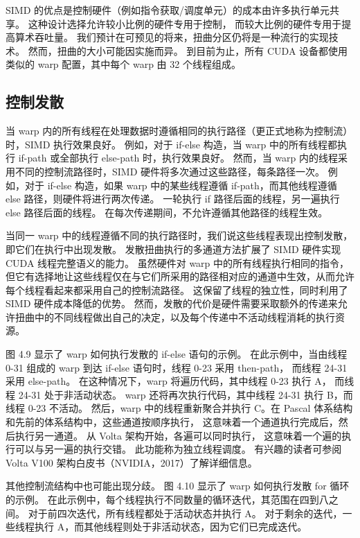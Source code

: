 SIMD 的优点是控制硬件（例如指令获取/调度单元）的成本由许多执行单元共享。 这种设计选择允许较小比例的硬件专用于控制，
而较大比例的硬件专用于提高算术吞吐量。 我们预计在可预见的将来，扭曲分区仍将是一种流行的实现技术。 
然而，扭曲的大小可能因实施而异。 到目前为止，所有 CUDA 设备都使用类似的 warp 配置，其中每个 warp 由 32 个线程组成。

\subsection{控制发散}
当 warp 内的所有线程在处理数据时遵循相同的执行路径（更正式地称为控制流）时，SIMD 执行效果良好。 
例如，对于 if-else 构造，当 warp 中的所有线程都执行 if-path 或全部执行 else-path 时，执行效果良好。 
然而，当 warp 内的线程采用不同的控制流路径时，SIMD 硬件将多次通过这些路径，每条路径一次。 
例如，对于 if-else 构造，如果 warp 中的某些线程遵循 if-path，而其他线程遵循 else 路径，则硬件将进行两次传递。 
一轮执行 if 路径后面的线程，另一遍执行 else 路径后面的线程。 在每次传递期间，不允许遵循其他路径的线程生效。

当同一 warp 中的线程遵循不同的执行路径时，我们说这些线程表现出控制发散，即它们在执行中出现发散。 
发散扭曲执行的多通道方法扩展了 SIMD 硬件实现 CUDA 线程完整语义的能力。 虽然硬件对 warp 中的所有线程执行相同的指令，
但它有选择地让这些线程仅在与它们所采用的路径相对应的通道中生效，从而允许每个线程看起来都采用自己的控制流路径。 
这保留了线程的独立性，同时利用了 SIMD 硬件成本降低的优势。 
然而，发散的代价是硬件需要采取额外的传递来允许扭曲中的不同线程做出自己的决定，以及每个传递中不活动线程消耗的执行资源。

图 4.9 显示了 warp 如何执行发散的 if-else 语句的示例。 
在此示例中，当由线程 0-31 组成的 warp 到达 if-else 语句时，线程 0-23 采用 then-path，
而线程 24-31 采用 else-path。 在这种情况下，warp 将遍历代码，其中线程 0-23 执行 A，
而线程 24-31 处于非活动状态。 warp 还将再次执行代码，其中线程 24-31 执行 B，而线程 0-23 不活动。 
然后，warp 中的线程重新聚合并执行 C。在 Pascal 体系结构和先前的体系结构中，这些通道按顺序执行，
这意味着一个通道执行完成后，然后执行另一通道。 从 Volta 架构开始，各遍可以同时执行，
这意味着一个遍的执行可以与另一遍的执行交错。 此功能称为独立线程调度。 
有兴趣的读者可参阅 Volta V100 架构白皮书（NVIDIA，2017）了解详细信息。

其他控制流结构中也可能出现分歧。 图 4.10 显示了 warp 如何执行发散 for 循环的示例。 
在此示例中，每个线程执行不同数量的循环迭代，其范围在四到八之间。 对于前四次迭代，所有线程都处于活动状态并执行 A。
对于剩余的迭代，一些线程执行 A，而其他线程则处于非活动状态，因为它们已完成迭代。

